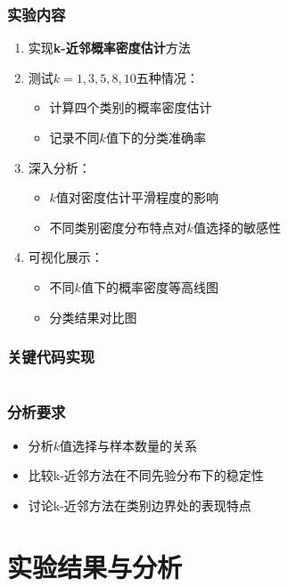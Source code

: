 \documentclass[12pt]{article}
\begin{document}
\subsubsection{实验内容}
\begin{enumerate}
    \item 实现\textbf{k-近邻概率密度估计}方法
    \item 测试$k = 1, 3, 5, 8, 10$五种情况：
    \begin{itemize}
        \item 计算四个类别的概率密度估计
        \item 记录不同$k$值下的分类准确率
    \end{itemize}
    \item 深入分析：
    \begin{itemize}
        \item $k$值对密度估计平滑程度的影响
        \item 不同类别密度分布特点对$k$值选择的敏感性
    \end{itemize}
    \item 可视化展示：
    \begin{itemize}
        \item 不同$k$值下的概率密度等高线图
        \item 分类结果对比图
    \end{itemize}
\end{enumerate}

\subsubsection{关键代码实现}
\begin{lstlisting}[caption=k-近邻密度估计代码]

\end{lstlisting}

\subsubsection{分析要求}
\begin{itemize}
    \item 分析$k$值选择与样本数量的关系
    \item 比较k-近邻方法在不同先验分布下的稳定性
    \item 讨论k-近邻方法在类别边界处的表现特点
\end{itemize}

\section{实验结果与分析}
\end{document}
